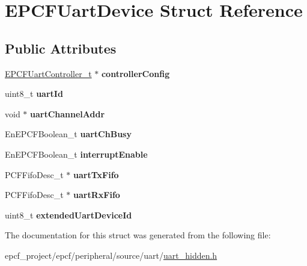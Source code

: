 \hypertarget{structEPCFUartDevice}{}\section{E\+P\+C\+F\+Uart\+Device Struct Reference}
\label{structEPCFUartDevice}
\subsection*{Public Attributes}
\begin{DoxyCompactItemize}
\item 
\mbox{\label{structEPCFUartDevice_a831c0d3bf8dae9e633ea9204c72ee2fa}} 
\mbox{\hyperlink{structEPCFUartController}{E\+P\+C\+F\+Uart\+Controller\+\_\+t}} $\ast$ {\bfseries controller\+Config}
\item 
\mbox{\label{structEPCFUartDevice_ac76110b647c46e9ebe2ac7fca100607d}} 
uint8\+\_\+t {\bfseries uart\+Id}
\item 
\mbox{\label{structEPCFUartDevice_a3c4f608cf0aa0a9517be56a26b7aba8c}} 
void $\ast$ {\bfseries uart\+Channel\+Addr}
\item 
\mbox{\label{structEPCFUartDevice_a2e0fa47f188c62e1b130fc39d4619c08}} 
En\+E\+P\+C\+F\+Boolean\+\_\+t {\bfseries uart\+Ch\+Busy}
\item 
\mbox{\label{structEPCFUartDevice_aabfd77a2a732ec7cb51a3a06988d2ed9}} 
En\+E\+P\+C\+F\+Boolean\+\_\+t {\bfseries interrupt\+Enable}
\item 
\mbox{\label{structEPCFUartDevice_a144523a185de4a7a186bd8b2ebb88db4}} 
P\+C\+F\+Fifo\+Desc\+\_\+t $\ast$ {\bfseries uart\+Tx\+Fifo}
\item 
\mbox{\label{structEPCFUartDevice_af5217bc79a4f8ee83a8dcd0c3d413b39}} 
P\+C\+F\+Fifo\+Desc\+\_\+t $\ast$ {\bfseries uart\+Rx\+Fifo}
\item 
\mbox{\label{structEPCFUartDevice_a8e80395f64edc93eeb303a4c5b1f4afa}} 
uint8\+\_\+t {\bfseries extended\+Uart\+Device\+Id}
\end{DoxyCompactItemize}


The documentation for this struct was generated from the following file\+:\begin{DoxyCompactItemize}
\item 
epcf\+\_\+project/epcf/peripheral/source/uart/\mbox{\hyperlink{uart__hidden_8h}{uart\+\_\+hidden.\+h}}\end{DoxyCompactItemize}
